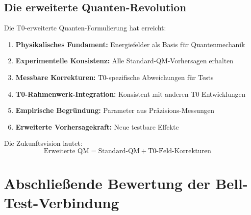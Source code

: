 \documentclass[12pt,a4paper]{article}
\begin{document}
		\subsection{Die erweiterte Quanten-Revolution}
		
		Die T0-erweiterte Quanten-Formulierung hat erreicht:
		\begin{enumerate}
			\item \textbf{Physikalisches Fundament:} Energiefelder als Basis f\"ur Quantenmechanik
			\item \textbf{Experimentelle Konsistenz:} Alle Standard-QM-Vorhersagen erhalten
			\item \textbf{Messbare Korrekturen:} T0-spezifische Abweichungen f\"ur Tests
			\item \textbf{T0-Rahmenwerk-Integration:} Konsistent mit anderen T0-Entwicklungen
			\item \textbf{Empirische Begr\"undung:} Parameter aus Pr\"azisions-Messungen
			\item \textbf{Erweiterte Vorhersagekraft:} Neue testbare Effekte
		\end{enumerate}
		
		Die Zukunftsvision lautet:
		\begin{equation}
			\boxed{\text{Erweiterte QM} = \text{Standard-QM} + \text{T0-Feld-Korrekturen}}
		\end{equation}
	
	
	\section{Abschlie\ss{}ende Bewertung der Bell-Test-Verbindung}
	
\end{document}
